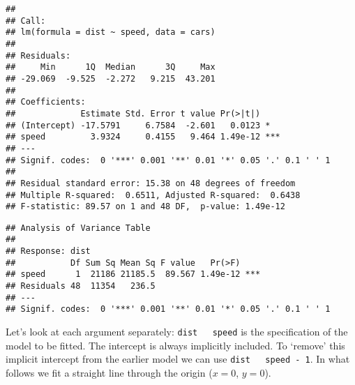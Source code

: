 \begin{knitrout}
\color{fgcolor}\begin{kframe}
\begin{alltt}
 
\end{alltt}
\begin{verbatim}
## 
## Call:
## lm(formula = dist ~ speed, data = cars)
## 
## Residuals:
##     Min      1Q  Median      3Q     Max 
## -29.069  -9.525  -2.272   9.215  43.201 
## 
## Coefficients:
##             Estimate Std. Error t value Pr(>|t|)    
## (Intercept) -17.5791     6.7584  -2.601   0.0123 *  
## speed         3.9324     0.4155   9.464 1.49e-12 ***
## ---
## Signif. codes:  0 '***' 0.001 '**' 0.01 '*' 0.05 '.' 0.1 ' ' 1
## 
## Residual standard error: 15.38 on 48 degrees of freedom
## Multiple R-squared:  0.6511,	Adjusted R-squared:  0.6438 
## F-statistic: 89.57 on 1 and 48 DF,  p-value: 1.49e-12
\end{verbatim}
\begin{alltt}
 
\end{alltt}
\begin{verbatim}
## Analysis of Variance Table
## 
## Response: dist
##           Df Sum Sq Mean Sq F value   Pr(>F)    
## speed      1  21186 21185.5  89.567 1.49e-12 ***
## Residuals 48  11354   236.5                     
## ---
## Signif. codes:  0 '***' 0.001 '**' 0.01 '*' 0.05 '.' 0.1 ' ' 1
\end{verbatim}
\end{kframe}
\end{knitrout}

Let's look at each argument separately: \texttt{dist ~ speed} is the specification of the model to be fitted. The intercept is always implicitly included. To `remove' this implicit intercept from the earlier model we can use \texttt{dist ~ speed - 1}. In what follows we fit a straight line through the origin ($x = 0$, $y = 0$).

